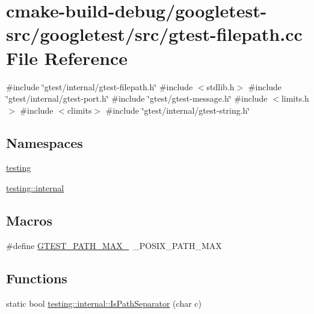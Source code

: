 \hypertarget{gtest-filepath_8cc}{}\section{cmake-\/build-\/debug/googletest-\/src/googletest/src/gtest-\/filepath.cc File Reference}
\label{gtest-filepath_8cc}
{\ttfamily \#include \char`\"{}gtest/internal/gtest-\/filepath.\+h\char`\"{}}\newline
{\ttfamily \#include $<$stdlib.\+h$>$}\newline
{\ttfamily \#include \char`\"{}gtest/internal/gtest-\/port.\+h\char`\"{}}\newline
{\ttfamily \#include \char`\"{}gtest/gtest-\/message.\+h\char`\"{}}\newline
{\ttfamily \#include $<$limits.\+h$>$}\newline
{\ttfamily \#include $<$climits$>$}\newline
{\ttfamily \#include \char`\"{}gtest/internal/gtest-\/string.\+h\char`\"{}}\newline
\subsection*{Namespaces}
\begin{DoxyCompactItemize}
\item 
 \mbox{\hyperlink{namespacetesting}{testing}}
\item 
 \mbox{\hyperlink{namespacetesting_1_1internal}{testing\+::internal}}
\end{DoxyCompactItemize}
\subsection*{Macros}
\begin{DoxyCompactItemize}
\item 
\#define \mbox{\hyperlink{gtest-filepath_8cc_ad9d445747785a9271a57cf1d392b89ad}{G\+T\+E\+S\+T\+\_\+\+P\+A\+T\+H\+\_\+\+M\+A\+X\+\_\+}}~\+\_\+\+P\+O\+S\+I\+X\+\_\+\+P\+A\+T\+H\+\_\+\+M\+AX
\end{DoxyCompactItemize}
\subsection*{Functions}
\begin{DoxyCompactItemize}
\item 
static bool \mbox{\hyperlink{namespacetesting_1_1internal_a6b8d22cee9edbbfe56077420a6fa1cb1}{testing\+::internal\+::\+Is\+Path\+Separator}} (char c)
\end{DoxyCompactItemize}
